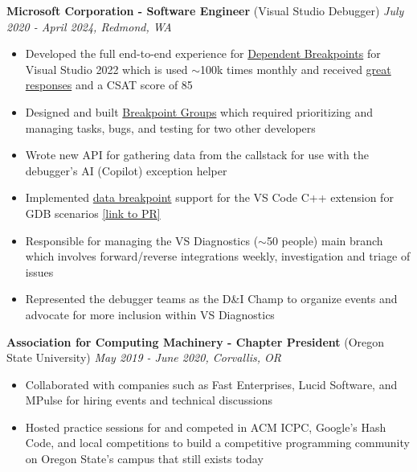 \documentclass{article}
\begin{document}
\noindent \normalsize \textbf{Microsoft Corporation - Software Engineer} \footnotesize (Visual Studio Debugger) \hfill \small \textit{July 2020 - April 2024, Redmond, WA}
\begin{itemize}
\item Developed the full end-to-end experience for \href{https://learn.microsoft.com/en-us/visualstudio/debugger/using-breakpoints?view=vs-2022#BKMK_set_a_dependent_breakpoint}{Dependent Breakpoints} for Visual Studio 2022 which is used $\sim$100k times monthly and received \href{https://twitter.com/VS_Debugger/status/1437902110822047750}{great responses} and a CSAT score of 85
\item Designed and built \href{https://devblogs.microsoft.com/visualstudio/streamlining-your-debugging-process-with-breakpoint-groups/}{Breakpoint Groups} which required prioritizing and managing tasks, bugs, and testing for two other developers 
\item Wrote new API for gathering data from the callstack for use with the debugger's AI (Copilot) exception helper
\item Implemented \href{https://devblogs.microsoft.com/cppblog/whats-new-for-c-debugging-in-visual-studio-code/#data-breakpoints}{data breakpoint} support for the VS Code C++ extension for GDB scenarios \href{https://github.com/microsoft/MIEngine/pull/1257}{[link to PR]}
\item Responsible for managing the VS Diagnostics ($\sim$50 people) main branch which involves forward/reverse integrations weekly, investigation and triage of issues
\item Represented the debugger teams as the D\&I Champ to organize events and advocate for more inclusion within VS Diagnostics
\end{itemize}

\vskip 0.1in

\noindent \normalsize \textbf{Association for Computing Machinery - Chapter President} \footnotesize (Oregon State University) \hfill \small \textit{May 2019 - June 2020, Corvallis, OR}
\begin{itemize}
\item Collaborated with companies such as Fast Enterprises, Lucid Software, and MPulse for hiring events and technical discussions
\item Hosted practice sessions for and competed in ACM ICPC, Google’s Hash Code, and local competitions to build a competitive programming community on Oregon State's campus that still exists today
\end{itemize}
\end{document}
